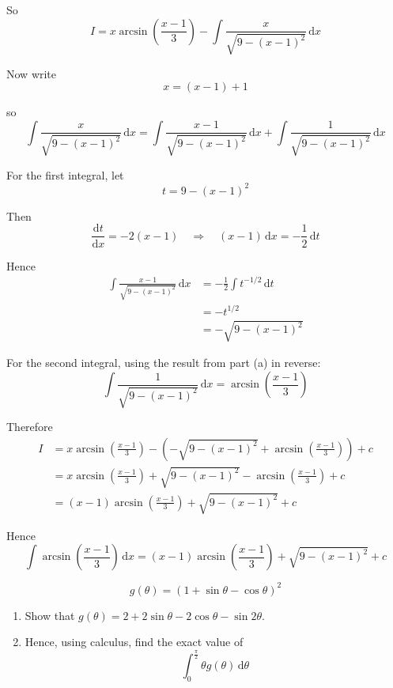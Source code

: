 \documentclass[leqno]{article}
\begin{document}
\begin{enumerate}[
  label=\textbf{\arabic*.},
  leftmargin=*,
  topsep=0pt,
  partopsep=0pt,
  parsep=0pt
]
\begin{djsSolution}
\begin{enumerate}[label=\textbf{(\alph*)}]
So
\[
I=x\arcsin\left(\frac{x-1}{3}\right)-\int \frac{x}{\sqrt{9-(x-1)^2}}\,\mathrm{d}x
\]

Now write
\[
x=(x-1)+1
\]

so
\[
\int \frac{x}{\sqrt{9-(x-1)^2}}\,\mathrm{d}x
=\int \frac{x-1}{\sqrt{9-(x-1)^2}}\,\mathrm{d}x+\int \frac{1}{\sqrt{9-(x-1)^2}}\,\mathrm{d}x
\]

For the first integral, let
\[
t=9-(x-1)^2
\]

Then
\[
\frac{\mathrm{d}t}{\mathrm{d}x}=-2(x-1)
\quad\Longrightarrow\quad
(x-1)\,\mathrm{d}x=-\frac12\,\mathrm{d}t
\]

Hence
\begin{align*}
\int \frac{x-1}{\sqrt{9-(x-1)^2}}\,\mathrm{d}x
&=-\frac12\int t^{-1/2}\,\mathrm{d}t \\
&=-t^{1/2} \\
&=-\sqrt{9-(x-1)^2}
\end{align*}

For the second integral, using the result from part (a) in reverse:
\[
\int \frac{1}{\sqrt{9-(x-1)^2}}\,\mathrm{d}x
=\arcsin\left(\frac{x-1}{3}\right)
\]

Therefore
\begin{align*}
I
&=x\arcsin\left(\frac{x-1}{3}\right)-\left(-\sqrt{9-(x-1)^2}+\arcsin\left(\frac{x-1}{3}\right)\right)+c \\
&=x\arcsin\left(\frac{x-1}{3}\right)+\sqrt{9-(x-1)^2}-\arcsin\left(\frac{x-1}{3}\right)+c \\
&=(x-1)\arcsin\left(\frac{x-1}{3}\right)+\sqrt{9-(x-1)^2}+c
\end{align*}

Hence
\[
\int \arcsin\left(\frac{x-1}{3}\right)\,\mathrm{d}x
=(x-1)\arcsin\left(\frac{x-1}{3}\right)+\sqrt{9-(x-1)^2}+c
\]
\end{enumerate}
\end{djsSolution}


\newpage

\questionitem

\[
g(\theta)=(1+\sin\theta-\cos\theta)^2
\]
\begin{enumerate}[label=\textbf{(\alph*)}]
  \item Show that $g(\theta)=2+2\sin\theta-2\cos\theta-\sin 2\theta$.  \\
  \item Hence, using calculus, find the exact value of
  \[
  \int_{0}^{\frac{\pi}{2}} \theta g(\theta)\,\mathrm{d}\theta
  \]
\end{enumerate}


\end{enumerate}
\end{document}
